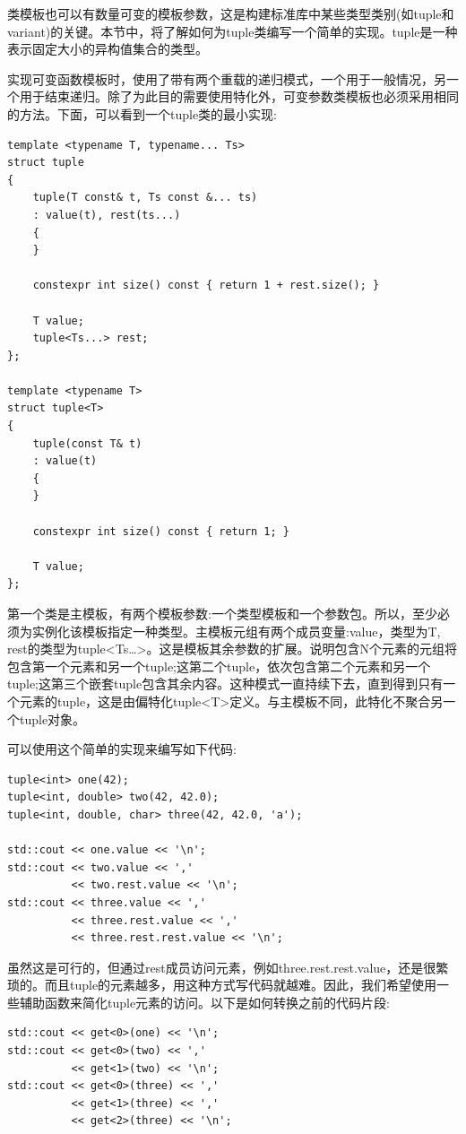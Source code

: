 类模板也可以有数量可变的模板参数，这是构建标准库中某些类型类别(如tuple和variant)的关键。本节中，将了解如何为tuple类编写一个简单的实现。tuple是一种表示固定大小的异构值集合的类型。

实现可变函数模板时，使用了带有两个重载的递归模式，一个用于一般情况，另一个用于结束递归。除了为此目的需要使用特化外，可变参数类模板也必须采用相同的方法。下面，可以看到一个tuple类的最小实现:

\begin{lstlisting}[style=styleCXX]
template <typename T, typename... Ts>
struct tuple
{
	tuple(T const& t, Ts const &... ts)
	: value(t), rest(ts...)
	{
	}

	constexpr int size() const { return 1 + rest.size(); }
	
	T value;
	tuple<Ts...> rest;
};

template <typename T>
struct tuple<T>
{
	tuple(const T& t)
	: value(t)
	{
	}

	constexpr int size() const { return 1; }
	
	T value;
};
\end{lstlisting}

第一个类是主模板，有两个模板参数:一个类型模板和一个参数包。所以，至少必须为实例化该模板指定一种类型。主模板元组有两个成员变量:value，类型为T, rest的类型为tuple<Ts…>。这是模板其余参数的扩展。说明包含N个元素的元组将包含第一个元素和另一个tuple;这第二个tuple，依次包含第二个元素和另一个tuple;这第三个嵌套tuple包含其余内容。这种模式一直持续下去，直到得到只有一个元素的tuple，这是由偏特化tuple<T>定义。与主模板不同，此特化不聚合另一个tuple对象。

可以使用这个简单的实现来编写如下代码:

\begin{lstlisting}[style=styleCXX]
tuple<int> one(42);
tuple<int, double> two(42, 42.0);
tuple<int, double, char> three(42, 42.0, 'a');

std::cout << one.value << '\n';
std::cout << two.value << ','
          << two.rest.value << '\n';
std::cout << three.value << ','
          << three.rest.value << ','
          << three.rest.rest.value << '\n';
\end{lstlisting}

虽然这是可行的，但通过rest成员访问元素，例如three.rest.rest.value，还是很繁琐的。而且tuple的元素越多，用这种方式写代码就越难。因此，我们希望使用一些辅助函数来简化tuple元素的访问。以下是如何转换之前的代码片段:

\begin{lstlisting}[style=styleCXX]
std::cout << get<0>(one) << '\n';
std::cout << get<0>(two) << ','
          << get<1>(two) << '\n';
std::cout << get<0>(three) << ','
          << get<1>(three) << ','
          << get<2>(three) << '\n';
\end{lstlisting}

